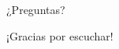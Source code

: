 \documentclass[12pt,center]{beamer}
\begin{document}
\begin{frame}
 {\Huge ¿Preguntas?}
\end{frame}

\begin{frame}
 {\Huge ¡Gracias por escuchar!}
\end{frame}



% 
% 
% 
% 

\begin{frame}
\begin{figure}[center]
\end{figure}
\end{frame}
\end{document}
